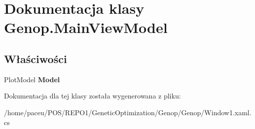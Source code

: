 \hypertarget{classGenop_1_1MainViewModel}{}\section{Dokumentacja klasy Genop.\+Main\+View\+Model}
\label{classGenop_1_1MainViewModel}
\subsection*{Właściwości}
\begin{DoxyCompactItemize}
\item 
Plot\+Model {\bfseries Model}\hypertarget{classGenop_1_1MainViewModel_aa9c636994e88a30f28caaee2435b2423}{}\label{classGenop_1_1MainViewModel_aa9c636994e88a30f28caaee2435b2423}

\end{DoxyCompactItemize}


Dokumentacja dla tej klasy została wygenerowana z pliku\+:\begin{DoxyCompactItemize}
\item 
/home/paceu/\+P\+O\+S/\+R\+E\+P\+O1/\+Genetic\+Optimization/\+Genop/\+Genop/Window1.\+xaml.\+cs\end{DoxyCompactItemize}
